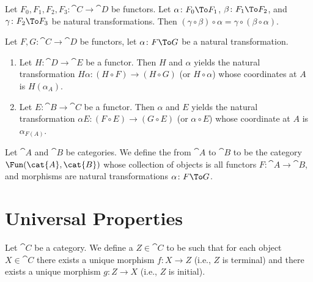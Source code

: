 \begin{theorem}
Let $F_{0},F_{1},F_{2},F_{3}\colon\cat{C}\to\cat{D}$ be functors.
Let $\alpha\colon F_{0}\To F_{1}$, $\beta\colon F_{1}\To F_{2}$, and
$\gamma\colon F_{2}\To F_{3}$ be natural transformations.
Then $(\gamma\circ\beta)\circ\alpha=\gamma\circ(\beta\circ\alpha)$.
\end{theorem}

\begin{definition}[Whiskering]
Let $F,G\colon\cat{C}\to\cat{D}$ be functors, let $\alpha\colon F\To G$
be a natural transformation.
\begin{enumerate}
\item{} Let $H\colon\cat{D}\to\cat{E}$ be a functor. Then
 $H$ and $\alpha$ yields the natural transformation
$H\alpha\colon(H\circ F)\to(H\circ G)$ (or $H\circ\alpha$) whose
coordinates at $A$ is $H(\alpha_{A})$.
\item{} Let $E\colon\cat{B}\to\cat{C}$ be a functor. Then
 $\alpha$ and $E$ yields the natural transformation
$\alpha E\colon(F\circ E)\to(G\circ E)$ (or $\alpha\circ E$) whose
coordinate at $A$ is $\alpha_{F(A)}$. 
\end{enumerate}
\end{definition}

\begin{definition}
Let $\cat{A}$ and $\cat{B}$ be categories.
We define the  from $\cat{A}$ to $\cat{B}$ to
be the category $\Fun(\cat{A},\cat{B})$ whose collection of objects is
all functors $F\colon\cat{A}\to\cat{B}$, and morphisms are natural
transformations $\alpha\colon F\To G$.
\end{definition}

\section{Universal Properties}

\begin{definition}
Let $\cat{C}$ be a category. We define a 
$Z\in\cat{C}$ to be such that for each object $X\in\cat{C}$ there
exists a unique morphism $f\colon X\to Z$ (i.e., $Z$ is terminal) and
there exists a unique morphism $g\colon Z\to X$ (i.e., $Z$ is initial).
\end{definition}

